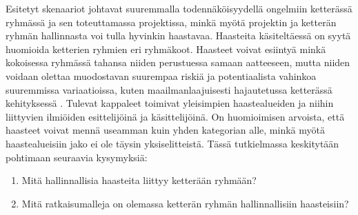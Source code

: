 Esitetyt skenaariot johtavat suuremmalla todennäköisyydellä ongelmiin ketterässä ryhmässä ja sen toteuttamassa projektissa, minkä myötä projektin ja ketterän ryhmän hallinnasta voi tulla hyvinkin haastavaa. Haasteita käsiteltäessä on syytä huomioida ketterien ryhmien eri ryhmäkoot. Haasteet voivat esiintyä minkä kokoisessa ryhmässä tahansa niiden perustuessa samaan aatteeseen, mutta niiden voidaan olettaa muodostavan suurempaa riskiä ja potentiaalista vahinkoa suuremmissa variaatioissa, kuten maailmanlaajuisesti hajautetussa ketterässä kehityksessä \cite{ALZOUBI201622}. Tulevat kappaleet toimivat yleisimpien haastealueiden ja niihin liittyvien ilmiöiden esittelijöinä ja käsittelijöinä. On huomioimisen arvoista, että haasteet voivat mennä useamman kuin yhden kategorian alle, minkä myötä haastealueisiin jako ei ole täysin yksiselitteistä. Tässä tutkielmassa keskitytään pohtimaan seuraavia kysymyksiä: \begin{enumerate}
    \item Mitä hallinnallisia haasteita liittyy ketterään ryhmään?
    \item Mitä ratkaisumalleja on olemassa ketterän ryhmän hallinnallisiin haasteisiin?
\end{enumerate}
